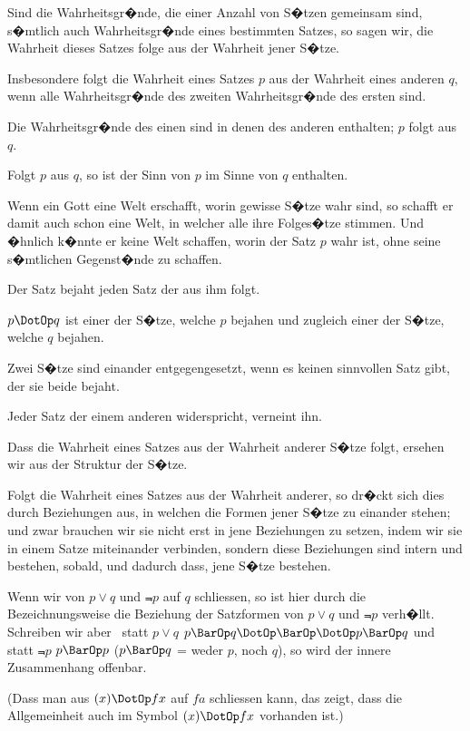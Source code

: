 {Sind die Wahrheitsgr�nde, die einer Anzahl
von S�tzen gemeinsam sind, s�mtlich auch Wahrheitsgr�nde
eines bestimmten Satzes, so sagen
wir, die Wahrheit dieses Satzes folge aus der
Wahrheit jener S�tze.}


{Insbesondere folgt die Wahrheit eines Satzes
\glqq{}$p$\grqq{} aus der Wahrheit eines anderen \glqq{}$q$\grqq{}, wenn
alle Wahrheitsgr�nde des zweiten Wahrheitsgr�nde
des ersten sind.}


{Die Wahrheitsgr�nde des einen sind in denen
des anderen enthalten; $p$ folgt aus $q$.}


{Folgt $p$ aus $q$, so ist der Sinn von \glqq{}$p$\grqq{} im
Sinne von \glqq{}$q$\grqq{} enthalten.}


{Wenn ein Gott eine Welt erschafft, worin
gewisse S�tze wahr sind, so schafft er damit auch
schon eine Welt, in welcher alle ihre Folges�tze
stimmen. Und �hnlich k�nnte er keine Welt
schaffen, worin der Satz \glqq{}$p$\grqq{} wahr ist, ohne seine
s�mtlichen Gegenst�nde zu schaffen.}


{Der Satz bejaht jeden Satz der aus ihm
folgt.}


{\glqq{}$p \DotOp q$\grqq{} ist einer der S�tze, welche \glqq{}$p$\grqq{} bejahen
und zugleich einer der S�tze, welche \glqq{}$q$\grqq{}
bejahen.

Zwei S�tze sind einander entgegengesetzt, wenn
es keinen sinnvollen Satz gibt, der sie beide
bejaht.

Jeder Satz der einem anderen widerspricht,
verneint ihn.}


{Dass die Wahrheit eines Satzes aus der Wahrheit
anderer S�tze folgt, ersehen wir aus der
Struktur der S�tze.}


{Folgt die Wahrheit eines Satzes aus der Wahrheit
anderer, so dr�ckt sich dies durch Beziehungen
aus, in welchen die Formen jener S�tze zu
einander stehen; und zwar brauchen wir sie nicht
erst in jene Beziehungen zu setzen, indem wir
sie in einem Satze miteinander verbinden, sondern
diese Beziehungen sind intern und bestehen, sobald,
und dadurch dass, jene S�tze bestehen.}


{Wenn wir von $p \lor q$ und $\Not{p}$ auf $q$ schliessen,
so ist hier durch die Bezeichnungsweise die Beziehung
der Satzformen von \glqq{}$p \lor q$\grqq{} und \glqq{}$\Not{p}$\grqq{} verh�llt.
Schreiben wir aber \zumBeispiel\ statt \glqq{}$p \lor q$\grqq{}
\glqq{}$p \BarOp q \DotOp \BarOp \DotOp p \BarOp q$\grqq{} und statt \glqq{}$\Not{p}$\grqq{} \glqq{}$p \BarOp p$\grqq{} ($p \BarOp q$ = weder
$p$, noch $q$), so wird der innere Zusammenhang
offenbar.

(Dass man aus $(x) \DotOp fx$ auf $fa$ schliessen kann,
das zeigt, dass die Allgemeinheit auch im Symbol
\glqq{}$(x) \DotOp fx$\grqq{} vorhanden ist.)}


